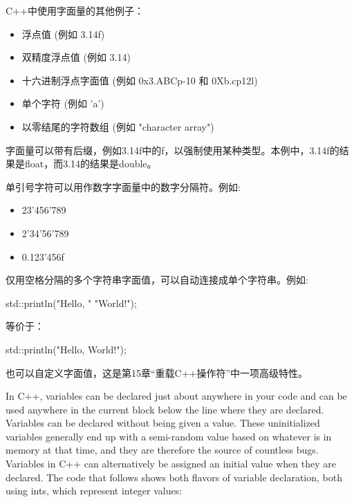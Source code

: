C++中使用字面量的其他例子：

\begin{itemize}
\item
浮点值 (例如 3.14f)

\item
双精度浮点值 (例如 3.14)

\item
十六进制浮点字面值 (例如 0x3.ABCp-10 和 0Xb.cp12l)

\item
单个字符 (例如 'a')

\item
以零结尾的字符数组 (例如 "character array")
\end{itemize}

字面量可以带有后缀，例如3.14f中的f，以强制使用某种类型。本例中，3.14f的结果是float，而3.14的结果是double。

单引号字符可以用作数字字面量中的数字分隔符。例如:

\begin{itemize}
\item
23'456'789

\item
2'34'56'789

\item
0.123'456f
\end{itemize}

仅用空格分隔的多个字符串字面值，可以自动连接成单个字符串。例如:

\begin{cpp}
std::println("Hello, "
             "World!");
\end{cpp}

等价于：

\begin{cpp}
std::println("Hello, World!");
\end{cpp}

也可以自定义字面值，这是第15章“重载C++操作符”中一项高级特性。


In C++, variables can be declared just about anywhere in your code and can be used anywhere in the current block below the line where they are declared. Variables can be declared without being given a value. These uninitialized variables generally end up with a semi-random value based on whatever is in memory at that time, and they are therefore the source of countless bugs. Variables in C++ can alternatively be assigned an initial value when they are declared. The code that follows shows both flavors of variable declaration, both using ints, which represent integer values:

